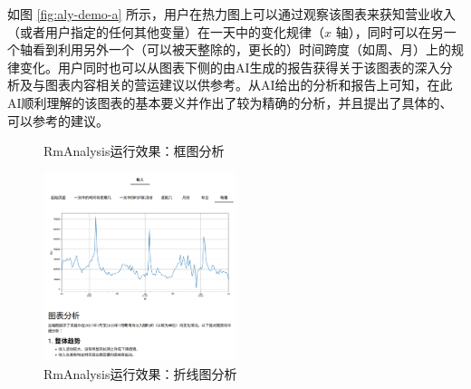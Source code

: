 如图 \ref{fig:aly-demo-a} 所示，用户在热力图上可以通过观察该图表来获知营业收入（或者用户指定的任何其他变量）在一天中的变化规律（$x$ 轴），同时可以在另一个轴看到利用另外一个（可以被天整除的，更长的）时间跨度（如周、月）上的规律变化。用户同时也可以从图表下侧的由AI生成的报告获得关于该图表的深入分析及与图表内容相关的营运建议以供参考。从AI给出的分析和报告上可知，在此AI顺利理解的该图表的基本要义并作出了较为精确的分析，并且提出了具体的、可以参考的建议。

\begin{figure}[htbp]
	\caption{RmAnalysis运行效果：框图分析}
	\label{fig:aly-demo-b}
\end{figure}

\begin{figure}[htbp]
	\centering
	\includegraphics[width=0.5\textwidth]{./exp/aly-demo-5.png}
	\caption{RmAnalysis运行效果：折线图分析}
	\label{fig:aly-demo-5}
\end{figure}

